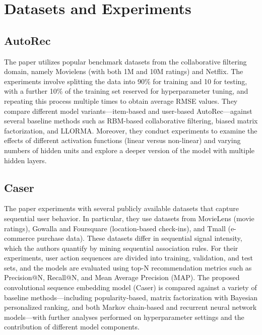 \documentclass{ieeetj}
\begin{document}
\section{Datasets and Experiments}
\subsection{AutoRec\cite{sedhain2015autorec}}
The paper utilizes popular benchmark datasets from the collaborative filtering domain, namely Movielens (with both 1M and 10M ratings) and Netflix. The experiments involve splitting the data into 90\% for training and 10 for testing, with a further 10\% of the training set reserved for hyperparameter tuning, and repeating this process multiple times to obtain average RMSE values. They compare different model variants—item-based and user-based AutoRec—against several baseline methods such as RBM-based collaborative filtering, biased matrix factorization, and LLORMA. Moreover, they conduct experiments to examine the effects of different activation functions (linear versus non-linear) and varying numbers of hidden units and explore a deeper version of the model with multiple hidden layers.
\subsection{Caser\cite{tang2018personalized}}
The paper experiments with several publicly available datasets that capture sequential user behavior. In particular, they use datasets from MovieLens (movie ratings), Gowalla and Foursquare (location-based check-ins), and Tmall (e-commerce purchase data). These datasets differ in sequential signal intensity, which the authors quantify by mining sequential association rules. For their experiments, user action sequences are divided into training, validation, and test sets, and the models are evaluated using top-N recommendation metrics such as Precision@N, Recall@N, and Mean Average Precision (MAP). The proposed convolutional sequence embedding model (Caser) is compared against a variety of baseline methods—including popularity-based, matrix factorization with Bayesian personalized ranking, and both Markov chain-based and recurrent neural network models—with further analyses performed on hyperparameter settings and the contribution of different model components.

\end{document}
